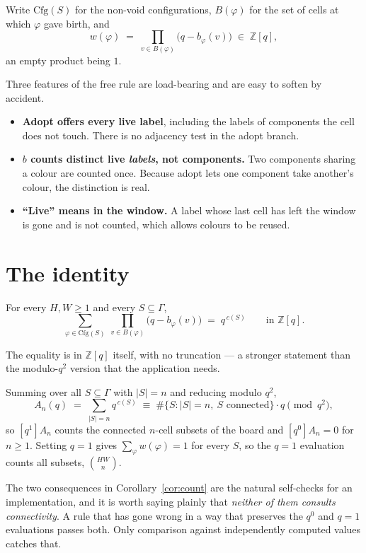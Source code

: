 \documentclass[11pt]{article}
\newcommand{\Z}{\mathbb{Z}}
\newcommand{\Cfg}{\mathrm{Cfg}}
\begin{document}
Write $\Cfg(S)$ for the non-void configurations, $B(\varphi)$ for the set of
cells at which $\varphi$ gave birth, and
\[
  w(\varphi) \;=\; \prod_{v \in B(\varphi)} \bigl(q - b_\varphi(v)\bigr) \;\in\; \Z[q],
\]
an empty product being $1$.

Three features of the free rule are load-bearing and are easy to soften by
accident.

\begin{itemize}
\item \textbf{Adopt offers every live label}, including the labels of components
  the cell does not touch. There is no adjacency test in the adopt branch.
\item \textbf{$b$ counts distinct live \emph{labels}, not components.} Two
  components sharing a colour are counted once. Because adopt lets one component
  take another's colour, the distinction is real.
\item \textbf{``Live'' means in the window.} A label whose last cell has left the
  window is gone and is not counted, which allows colours to be reused.
\end{itemize}

\section{The identity}
\label{sec:identity}

\begin{theorem}
\label{thm:main}
For every $H, W \ge 1$ and every $S \subseteq \Gamma$,
\[
  \sum_{\varphi \in \Cfg(S)} \ \prod_{v \in B(\varphi)} \bigl(q - b_\varphi(v)\bigr)
  \;=\; q^{\,c(S)} \qquad\text{in } \Z[q].
\]
\end{theorem}

The equality is in $\Z[q]$ itself, with no truncation --- a stronger statement
than the modulo-$q^2$ version that the application needs.

\begin{corollary}
\label{cor:count}
Summing over all $S \subseteq \Gamma$ with $|S| = n$ and reducing modulo $q^2$,
\[
  A_n(q) \;=\; \sum_{|S| = n} q^{\,c(S)}
  \;\equiv\; \#\{S : |S| = n,\ S \text{ connected}\}\cdot q \pmod{q^2},
\]
so $[q^1]A_n$ counts the connected $n$-cell subsets of the board and
$[q^0]A_n = 0$ for $n \ge 1$. Setting $q = 1$ gives $\sum_\varphi w(\varphi) = 1$
for every $S$, so the $q = 1$ evaluation counts all subsets, $\binom{HW}{n}$.
\end{corollary}

The two consequences in Corollary~\ref{cor:count} are the natural self-checks
for an implementation, and it is worth saying plainly that \emph{neither of them
consults connectivity}. A rule that has gone wrong in a way that preserves the
$q^0$ and $q=1$ evaluations passes both. Only comparison against independently
computed values catches that.
\end{document}
